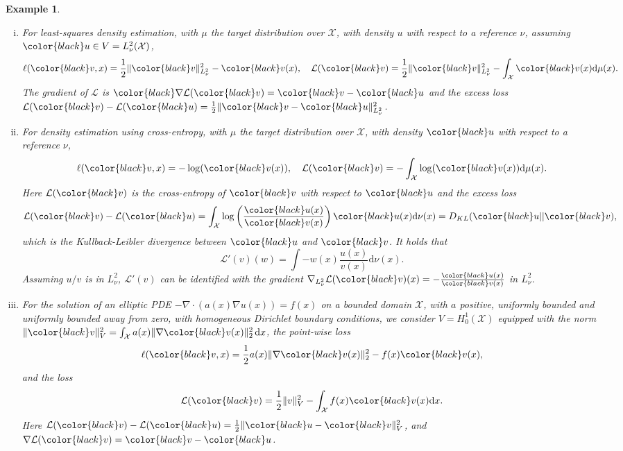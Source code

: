 \documentclass{article}
\theoremstyle{noparens}
\newtheorem{example}{Example}[section]
\newcommand{\cL}{\mathcal{L}}
\newcommand{\cX}{\mathcal{X}}
\newcommand{\dd}{\mathrm{d}}
\newcommand{\colorV}{\color{black}}
\newcommand{\colorM}{\color{black}}
\renewcommand{\u}{{\colorV u}}
\renewcommand{\v}{{\colorM v}}
\newcommand{\LossVGrad}{{\colorV \nabla \cL}}
\begin{document}
\begin{example}
\begin{enumerate}[(i)]
        \item For least-squares density estimation, with $\mu$ the target distribution over $\cX$, with density $u$ with respect to a reference $\nu$, assuming $\u\in V =L^2_\nu(\cX) $,
        $$\ell(\v , x) = \frac{1}{2} \Vert \v \Vert_{L^2_\nu}^2  -  \v(x), \quad \cL(\v) = \frac{1}{2}\Vert \v \Vert_{L^2_\nu}^2 - \int_\cX \v(x) \dd\mu(x).$$
         The gradient of $\cL$ is $\LossVGrad(\v) = \v - \u$ and the excess loss $\cL(\v) - \cL(\u) =  \frac 1 2 \Vert \v - \u \Vert_{L^2_\nu}^2$.
        \item For density estimation using cross-entropy, with $\mu$ the target distribution over $\cX$, with density $\u$ with respect to a reference $\nu$,
        $$\ell(\v, x) = -\log(\v(x)) , \quad \cL(\v) = - \int_\cX \log(\v(x))  \dd\mu(x).$$
        Here  $\cL(\v)$ is the cross-entropy of $\v$ with respect to $\u$ and the excess loss
        $$\cL(\v) - \cL(\u)=\int_\cX  \log\left(\frac{\u(x)}{\v(x)}\right) \u(x)\dd \nu(x) = D_{KL}(\u || \v),$$
        which is the Kullback-Leibler divergence between $\u$ and $\v$. It holds that
        $$\cL'(v)(w)=\int -w(x)\frac{u(x)}{v(x)} \dd\nu(x).$$
        Assuming $u/v$ is in $L^2_\nu$, $\cL'(v)$ can be identified with the gradient $\nabla_{L^2_\nu}\cL(\v)(x) = - \frac{\u(x)}{\v(x)}$ in $L^2_\nu$.
        \item For the solution of an elliptic PDE $- \nabla\cdot (a(x) \nabla u(x) ) = f(x)$ on a bounded  domain $\cX$, with $a$ positive, uniformly bounded and   uniformly bounded away from zero, with homogeneous Dirichlet boundary conditions,
        we consider $V = H^1_0(\cX)$ equipped with the norm $\Vert \v \Vert_V^2 = \int_{\cX} a(x) \Vert \nabla \v(x)\Vert_2^2 \, \dd x$, the point-wise loss
        $$
        \ell(\v ,x) = \frac{1}{2} a(x) \Vert \nabla \v(x)\Vert_2^2 - f(x) \v(x),
        $$
        and the loss
        $$\cL(\v) = \frac{1}{2} \Vert v \Vert_V^2 - \int_\cX f(x) \v(x) \dd x.
        $$
         Here $\cL(\v) - \cL(\u) = \frac{1}{2} \Vert \u- \v \Vert_V^2$, and $\nabla \cL(\v) = \v- \u$.


\end{enumerate}
\end{example}
\end{document}
